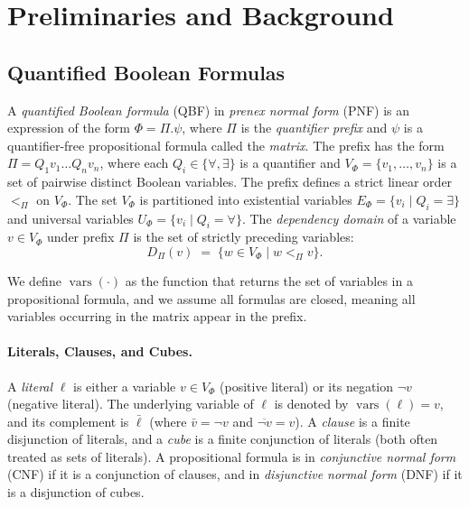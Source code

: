 \documentclass[runningheads]{llncs}
\DeclareMathOperator{\vars}{vars}
\begin{document}
\section{Preliminaries and Background}
\label{sec:preliminaries}

\subsection{Quantified Boolean Formulas}
\label{subsec:qbf}

A \emph{quantified Boolean formula} (QBF) in \emph{prenex normal form} (PNF) is an expression of the form $\Phi = \Pi.\psi$, where $\Pi$ is the \emph{quantifier prefix} and $\psi$ is a quantifier-free propositional formula called the \emph{matrix}.
The prefix has the form $\Pi = Q_1 v_1 \dots Q_n v_n$, where each $Q_i \in \{\forall, \exists\}$ is a quantifier and $V_\Phi = \{v_1, \dots, v_n\}$ is a set of pairwise distinct Boolean variables.
The prefix defines a strict linear order $<_\Pi$ on $V_\Phi$.
The set $V_\Phi$ is partitioned into existential variables $E_\Phi = \{v_i \mid Q_i = \exists\}$ and universal variables $U_\Phi = \{v_i \mid Q_i = \forall\}$.
The \emph{dependency domain} of a variable $v \in V_\Phi$ under prefix $\Pi$ is the set of strictly preceding variables:
\begin{equation}
    D_\Pi(v) \;=\; \{w \in V_\Phi \mid w <_\Pi v\} .
\end{equation}

We define $\vars(\cdot)$ as the function that returns the set of variables in a propositional formula, and we assume all formulas are closed, meaning all variables occurring in the matrix appear in the prefix.
\paragraph*{Literals, Clauses, and Cubes.}
A \emph{literal} $\ell$ is either a variable $v \in V_\Phi$ (positive literal) or its negation $\neg v$ (negative literal).
The underlying variable of $\ell$ is denoted by $\vars(\ell) = v$, and its complement is $\bar{\ell}$ (where $\bar{v} = \neg v$ and $\overline{\neg v} = v$).
A \emph{clause} is a finite disjunction of literals, and a \emph{cube} is a finite conjunction of literals (both often treated as sets of literals).
A propositional formula is in \emph{conjunctive normal form} (CNF) if it is a conjunction of clauses, and in \emph{disjunctive normal form} (DNF) if it is a disjunction of cubes.
\end{document}
